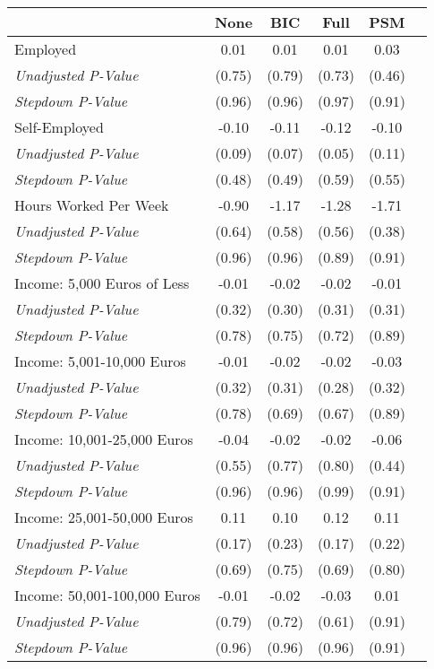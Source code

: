 \begin{tabular}{l c c c c c}
\toprule
 & None & BIC & Full & PSM \\
\midrule
Employed & 0.01 & 0.01 & 0.01 & 0.03 \\
\quad \textit{Unadjusted P-Value} & (0.75) & (0.79) & (0.73) & (0.46) \\
\quad \textit{Stepdown P-Value} & (0.96) & (0.96) & (0.97) & (0.91) \\
Self-Employed & -0.10 & -0.11 & -0.12 & -0.10 \\
\quad \textit{Unadjusted P-Value} & (0.09) & (0.07) & (0.05) & (0.11) \\
\quad \textit{Stepdown P-Value} & (0.48) & (0.49) & (0.59) & (0.55) \\
Hours Worked Per Week & -0.90 & -1.17 & -1.28 & -1.71 \\
\quad \textit{Unadjusted P-Value} & (0.64) & (0.58) & (0.56) & (0.38) \\
\quad \textit{Stepdown P-Value} & (0.96) & (0.96) & (0.89) & (0.91) \\
Income: 5,000 Euros of Less & -0.01 & -0.02 & -0.02 & -0.01 \\
\quad \textit{Unadjusted P-Value} & (0.32) & (0.30) & (0.31) & (0.31) \\
\quad \textit{Stepdown P-Value} & (0.78) & (0.75) & (0.72) & (0.89) \\
Income: 5,001-10,000 Euros & -0.01 & -0.02 & -0.02 & -0.03 \\
\quad \textit{Unadjusted P-Value} & (0.32) & (0.31) & (0.28) & (0.32) \\
\quad \textit{Stepdown P-Value} & (0.78) & (0.69) & (0.67) & (0.89) \\
Income: 10,001-25,000 Euros & -0.04 & -0.02 & -0.02 & -0.06 \\
\quad \textit{Unadjusted P-Value} & (0.55) & (0.77) & (0.80) & (0.44) \\
\quad \textit{Stepdown P-Value} & (0.96) & (0.96) & (0.99) & (0.91) \\
Income: 25,001-50,000 Euros & 0.11 & 0.10 & 0.12 & 0.11 \\
\quad \textit{Unadjusted P-Value} & (0.17) & (0.23) & (0.17) & (0.22) \\
\quad \textit{Stepdown P-Value} & (0.69) & (0.75) & (0.69) & (0.80) \\
Income: 50,001-100,000 Euros & -0.01 & -0.02 & -0.03 & 0.01 \\
\quad \textit{Unadjusted P-Value} & (0.79) & (0.72) & (0.61) & (0.91) \\
\quad \textit{Stepdown P-Value} & (0.96) & (0.96) & (0.96) & (0.91) \\
\bottomrule
\end{tabular}
